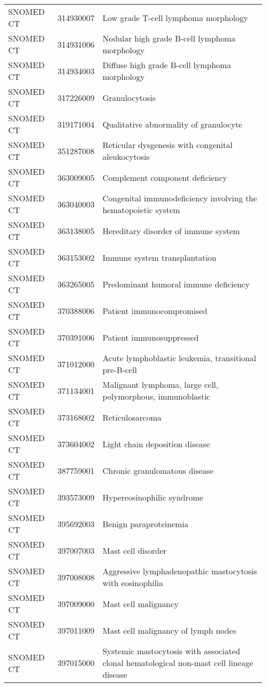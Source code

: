 \begin{longtable}{p{}p{}p{}}
  SNOMED CT & 314930007 & Low grade T-cell lymphoma morphology \\ 
  SNOMED CT & 314931006 & Nodular high grade B-cell lymphoma morphology \\ 
  SNOMED CT & 314934003 & Diffuse high grade B-cell lymphoma morphology \\ 
  SNOMED CT & 317226009 & Granulocytosis \\ 
  SNOMED CT & 319171004 & Qualitative abnormality of granulocyte \\ 
  SNOMED CT & 351287008 & Reticular dysgenesis with congenital aleukocytosis \\ 
  SNOMED CT & 363009005 & Complement component deficiency \\ 
  SNOMED CT & 363040003 & Congenital immunodeficiency involving the hematopoietic system \\ 
  SNOMED CT & 363138005 & Hereditary disorder of immune system \\ 
  SNOMED CT & 363153002 & Immune system transplantation \\ 
  SNOMED CT & 363265005 & Predominant humoral immune deficiency \\ 
  SNOMED CT & 370388006 & Patient immunocompromised \\ 
  SNOMED CT & 370391006 & Patient immunosuppressed \\ 
  SNOMED CT & 371012000 & Acute lymphoblastic leukemia, transitional pre-B-cell \\ 
  SNOMED CT & 371134001 & Malignant lymphoma, large cell, polymorphous, immunoblastic \\ 
  SNOMED CT & 373168002 & Reticulosarcoma \\ 
  SNOMED CT & 373604002 & Light chain deposition disease \\ 
  SNOMED CT & 387759001 & Chronic granulomatous disease \\ 
  SNOMED CT & 393573009 & Hypereosinophilic syndrome \\ 
  SNOMED CT & 395692003 & Benign paraproteinemia \\ 
  SNOMED CT & 397007003 & Mast cell disorder \\ 
  SNOMED CT & 397008008 & Aggressive lymphadenopathic mastocytosis with eosinophilia \\ 
  SNOMED CT & 397009000 & Mast cell malignancy \\ 
  SNOMED CT & 397011009 & Mast cell malignancy of lymph nodes \\ 
  SNOMED CT & 397015000 & Systemic mastocytosis with associated clonal hematological non-mast cell lineage disease \\ 

\end{longtable}
